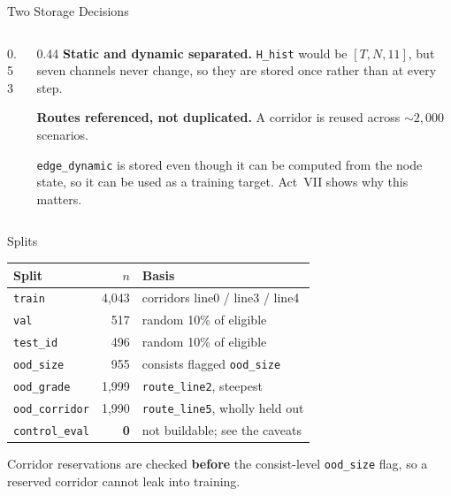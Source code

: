 \begin{frame}{Two Storage Decisions}
  \vspace{0.2em}
  \begin{columns}[c,onlytextwidth]
    \begin{column}{0.53\textwidth}
      \centering
      \scalebox{0.74}{\diskLayout}
    \end{column}
    \begin{column}{0.44\textwidth}
      \small
      \textbf{Static and dynamic separated.} \texttt{H\_hist} would be
      $[T,N,11]$, but seven channels never change, so they are stored once
      rather than at every step.

      \vspace{0.8em}
      \textbf{Routes referenced, not duplicated.} A corridor is reused across
      ${\sim}2{,}000$ scenarios.

      \vspace{0.8em}
      \alert{\texttt{edge\_dynamic} is stored} even though it can be computed
      from the node state, so it can be used as a training target. Act~VII
      shows why this matters.
    \end{column}
  \end{columns}
\end{frame}

\begin{frame}{Splits}
  \vspace{0.4em}
  \centering
  {\small
  \begin{tabular}{@{}lrl@{}}
    \toprule
    \textbf{Split} & \textbf{$n$} & \textbf{Basis} \\
    \midrule
    \texttt{train}         & 4,043 & corridors line0 / line3 / line4 \\
    \texttt{val}           &   517 & random 10\% of eligible \\
    \texttt{test\_id}      &   496 & random 10\% of eligible \\
    \texttt{ood\_size}     &   955 & consists flagged \texttt{ood\_size} \\
    \texttt{ood\_grade}    & 1,999 & \texttt{route\_line2}, steepest \\
    \texttt{ood\_corridor} & 1,990 & \texttt{route\_line5}, wholly held out \\
    \midrule
    \texttt{control\_eval} & \textcolor{uniCrimson}{\textbf{0}}
                           & \textcolor{uniCrimson}{not buildable; see the caveats} \\
    \bottomrule
  \end{tabular}}

  \vspace{1.0em}
  \begin{minipage}{0.92\textwidth}\small
    Corridor reservations are checked \textbf{before} the consist-level
    \texttt{ood\_size} flag, so a reserved corridor cannot leak into training.
  \end{minipage}
\end{frame}

